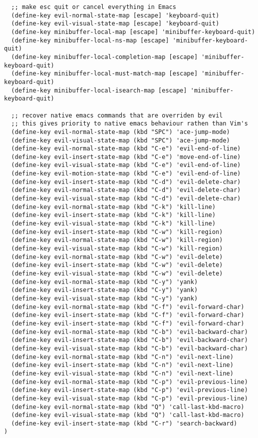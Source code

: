 \documentclass[11pt]{article}
\begin{document}
\begin{verbatim}
  ;; make esc quit or cancel everything in Emacs
  (define-key evil-normal-state-map [escape] 'keyboard-quit)
  (define-key evil-visual-state-map [escape] 'keyboard-quit)
  (define-key minibuffer-local-map [escape] 'minibuffer-keyboard-quit)
  (define-key minibuffer-local-ns-map [escape] 'minibuffer-keyboard-quit)
  (define-key minibuffer-local-completion-map [escape] 'minibuffer-keyboard-quit)
  (define-key minibuffer-local-must-match-map [escape] 'minibuffer-keyboard-quit)
  (define-key minibuffer-local-isearch-map [escape] 'minibuffer-keyboard-quit)

  ;; recover native emacs commands that are overriden by evil
  ;; this gives priority to native emacs behaviour rathen than Vim's
  (define-key evil-normal-state-map (kbd "SPC") 'ace-jump-mode)
  (define-key evil-visual-state-map (kbd "SPC") 'ace-jump-mode)
  (define-key evil-normal-state-map (kbd "C-e") 'evil-end-of-line)
  (define-key evil-insert-state-map (kbd "C-e") 'move-end-of-line)
  (define-key evil-visual-state-map (kbd "C-e") 'evil-end-of-line)
  (define-key evil-motion-state-map (kbd "C-e") 'evil-end-of-line)
  (define-key evil-insert-state-map (kbd "C-d") 'evil-delete-char)
  (define-key evil-normal-state-map (kbd "C-d") 'evil-delete-char)
  (define-key evil-visual-state-map (kbd "C-d") 'evil-delete-char)
  (define-key evil-normal-state-map (kbd "C-k") 'kill-line)
  (define-key evil-insert-state-map (kbd "C-k") 'kill-line)
  (define-key evil-visual-state-map (kbd "C-k") 'kill-line)
  (define-key evil-insert-state-map (kbd "C-w") 'kill-region)
  (define-key evil-normal-state-map (kbd "C-w") 'kill-region)
  (define-key evil-visual-state-map (kbd "C-w") 'kill-region)
  (define-key evil-normal-state-map (kbd "C-w") 'evil-delete)
  (define-key evil-insert-state-map (kbd "C-w") 'evil-delete)
  (define-key evil-visual-state-map (kbd "C-w") 'evil-delete)
  (define-key evil-normal-state-map (kbd "C-y") 'yank)
  (define-key evil-insert-state-map (kbd "C-y") 'yank)
  (define-key evil-visual-state-map (kbd "C-y") 'yank)
  (define-key evil-normal-state-map (kbd "C-f") 'evil-forward-char)
  (define-key evil-insert-state-map (kbd "C-f") 'evil-forward-char)
  (define-key evil-insert-state-map (kbd "C-f") 'evil-forward-char)
  (define-key evil-normal-state-map (kbd "C-b") 'evil-backward-char)
  (define-key evil-insert-state-map (kbd "C-b") 'evil-backward-char)
  (define-key evil-visual-state-map (kbd "C-b") 'evil-backward-char)
  (define-key evil-normal-state-map (kbd "C-n") 'evil-next-line)
  (define-key evil-insert-state-map (kbd "C-n") 'evil-next-line)
  (define-key evil-visual-state-map (kbd "C-n") 'evil-next-line)
  (define-key evil-normal-state-map (kbd "C-p") 'evil-previous-line)
  (define-key evil-insert-state-map (kbd "C-p") 'evil-previous-line)
  (define-key evil-visual-state-map (kbd "C-p") 'evil-previous-line)
  (define-key evil-normal-state-map (kbd "Q") 'call-last-kbd-macro)
  (define-key evil-visual-state-map (kbd "Q") 'call-last-kbd-macro)
  (define-key evil-insert-state-map (kbd "C-r") 'search-backward)
)
\end{verbatim}
\end{document}
